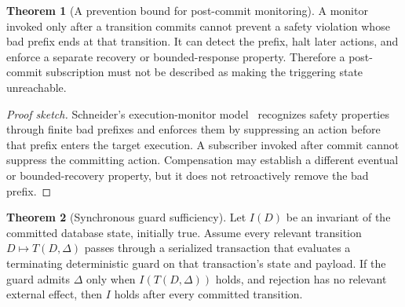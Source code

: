 \documentclass[11pt,a4paper]{article}
\theoremstyle{definition}
\newtheorem{theorem}{Theorem}[section]
\theoremstyle{remark}
\begin{document}
\begin{theorem}[A prevention bound for post-commit monitoring]\label{thm:schneider}
\setlength{\parskip}{4pt plus 1pt}
A monitor invoked only after a transition commits cannot prevent a safety violation
whose bad prefix ends at that transition. It can detect the prefix, halt later
actions, and enforce a separate recovery or bounded-response property. Therefore a
post-commit subscription must not be described as making the triggering state
unreachable.
\end{theorem}

\begin{proof}[Proof sketch]
\setlength{\parskip}{4pt plus 1pt}
Schneider's execution-monitor model~ recognizes safety
properties through finite bad prefixes and enforces them by suppressing an action
before that prefix enters the target execution. A subscriber invoked after commit
cannot suppress the committing action. Compensation may establish a different
eventual or bounded-recovery property, but it does not retroactively remove the bad
prefix.
\end{proof}


\begin{theorem}[Synchronous guard sufficiency]\label{thm:decidability}
Let $I(D)$ be an invariant of the committed database state, initially true.
Assume every relevant transition $D\mapsto T(D,\Delta)$ passes through a
serialized transaction that evaluates a terminating deterministic guard on
that transaction's state and payload. If the guard admits $\Delta$ only when
$I(T(D,\Delta))$ holds, and rejection has no relevant external effect, then
$I$ holds after every committed transition.
\end{theorem}
\end{document}
